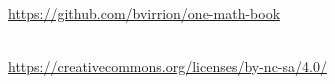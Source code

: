 \thispagestyle{empty}
\vspace*{\fill}
\begin{center}
\omcolophonsource\\[2pt]
\url{https://github.com/bvirrion/one-math-book}

\bigskip
\omcolophonlicense\\[2pt]
\url{https://creativecommons.org/licenses/by-nc-sa/4.0/}\\[6pt]
\omcolophoncredit
\end{center}
\vspace*{\fill}
\clearpage
